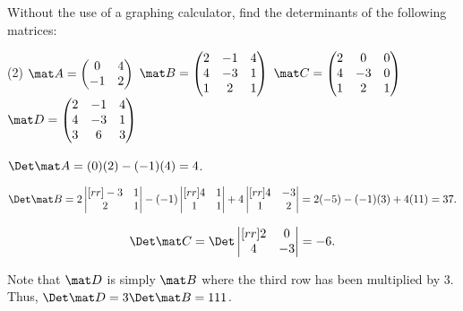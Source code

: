 \begin{problem}
    Without the use of a graphing calculator, find the determinants of the following matrices:
    \begin{tasks}(2)
        \task $\mat A = \begin{pmatrix}
            0 & 4 \\ -1 & 2
        \end{pmatrix}$
        \task $\mat B = \begin{pmatrix}
            2 & -1 & 4 \\ 4 & -3 & 1 \\ 1 & 2 & 1
        \end{pmatrix}$
        \task $\mat C = \begin{pmatrix}
            2 & 0 & 0 \\ 4 & -3 & 0 \\ 1 & 2 & 1
        \end{pmatrix}$
        \task $\mat D = \begin{pmatrix}
            2 & -1 & 4 \\ 4 & -3 & 1 \\ 3 & 6 & 3
        \end{pmatrix}$
    \end{tasks}
\end{problem}
\begin{solution}
    \begin{ppart}
        $\Det \mat A = (0)(2) - (-1)(4) = 4$.
    \end{ppart}
    \begin{ppart}
        \[\Det \mat B = 2 \begin{vmatrix}[rr]-3 & 1 \\ 2 & 1\end{vmatrix} - (-1) \begin{vmatrix}[rr]4 & 1 \\ 1 & 1\end{vmatrix} + 4 \begin{vmatrix}[rr]4 & -3 \\ 1 & 2\end{vmatrix} = 2(-5) - (-1)(3) + 4(11) = 37.\]
    \end{ppart}
    \begin{ppart}
        \[\Det \mat C = \Det \begin{vmatrix}[rr]2 & 0 \\ 4 & -3\end{vmatrix} = -6.\]
    \end{ppart}
    \begin{ppart}
        Note that $\mat D$ is simply $\mat B$ where the third row has been multiplied by 3. Thus, $\Det \mat D = 3 \Det \mat B = 111$.
    \end{ppart}
\end{solution}

